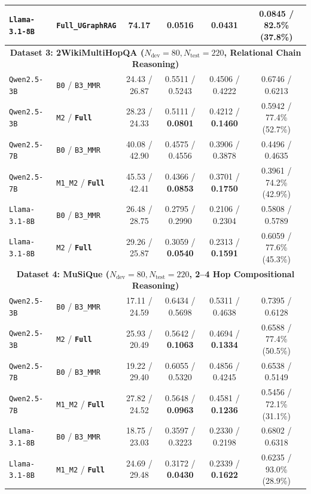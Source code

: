 \documentclass[11pt]{article}
\begin{document}
\begin{table}[t]
{{\begin{tabular}{llcccc}
\texttt{Llama-3.1-8B} & \textbf{\texttt{Full\_UGraphRAG}} & 74.17 & \textbf{0.0516} & \textbf{0.0431} & \textbf{0.0845} / 82.5\% (37.8\%) \\
\midrule
\multicolumn{6}{c}{\textbf{Dataset 3: 2WikiMultiHopQA ($N_{\text{dev}}=80, N_{\text{test}}=220$, Relational Chain Reasoning)}} \\
\midrule
\texttt{Qwen2.5-3B} & \texttt{B0} / \texttt{B3\_MMR} & 24.43 / 26.87 & 0.5511 / 0.5243 & 0.4506 / 0.4222 & 0.6746 / 0.6213 \\
\texttt{Qwen2.5-3B} & \texttt{M2} / \textbf{\texttt{Full}} & 28.23 / 24.33 & 0.5111 / \textbf{0.0801} & 0.4212 / \textbf{0.1460} & 0.5942 / 77.4\% (52.7\%) \\
\texttt{Qwen2.5-7B} & \texttt{B0} / \texttt{B3\_MMR} & 40.08 / 42.90 & 0.4575 / 0.4556 & 0.3906 / 0.3878 & 0.4496 / 0.4635 \\
\texttt{Qwen2.5-7B} & \texttt{M1\_M2} / \textbf{\texttt{Full}} & 45.53 / 42.41 & 0.4366 / \textbf{0.0853} & 0.3701 / \textbf{0.1750} & 0.3961 / 74.2\% (42.9\%) \\
\texttt{Llama-3.1-8B} & \texttt{B0} / \texttt{B3\_MMR} & 26.48 / 28.75 & 0.2795 / 0.2990 & 0.2106 / 0.2304 & 0.5808 / 0.5789 \\
\texttt{Llama-3.1-8B} & \texttt{M2} / \textbf{\texttt{Full}} & 29.26 / 25.87 & 0.3059 / \textbf{0.0540} & 0.2313 / \textbf{0.1591} & 0.6059 / 77.6\% (45.3\%) \\
\midrule
\multicolumn{6}{c}{\textbf{Dataset 4: MuSiQue ($N_{\text{dev}}=80, N_{\text{test}}=220$, 2--4 Hop Compositional Reasoning)}} \\
\midrule
\texttt{Qwen2.5-3B} & \texttt{B0} / \texttt{B3\_MMR} & 17.11 / 24.59 & 0.6434 / 0.5698 & 0.5311 / 0.4638 & 0.7395 / 0.6128 \\
\texttt{Qwen2.5-3B} & \texttt{M2} / \textbf{\texttt{Full}} & 25.93 / 20.49 & 0.5642 / \textbf{0.1063} & 0.4694 / \textbf{0.1334} & 0.6588 / 77.4\% (50.5\%) \\
\texttt{Qwen2.5-7B} & \texttt{B0} / \texttt{B3\_MMR} & 19.22 / 29.40 & 0.6055 / 0.5320 & 0.4856 / 0.4245 & 0.6538 / 0.5149 \\
\texttt{Qwen2.5-7B} & \texttt{M1\_M2} / \textbf{\texttt{Full}} & 27.82 / 24.52 & 0.5648 / \textbf{0.0963} & 0.4581 / \textbf{0.1236} & 0.5456 / 72.1\% (31.1\%) \\
\texttt{Llama-3.1-8B} & \texttt{B0} / \texttt{B3\_MMR} & 18.75 / 23.03 & 0.3597 / 0.3223 & 0.2330 / 0.2198 & 0.6802 / 0.6318 \\
\texttt{Llama-3.1-8B} & \texttt{M1\_M2} / \textbf{\texttt{Full}} & 24.69 / 29.48 & 0.3172 / \textbf{0.0430} & 0.2339 / \textbf{0.1622} & 0.6235 / 93.0\% (28.9\%) \\

\end{tabular}}}
\end{table}
\end{document}
